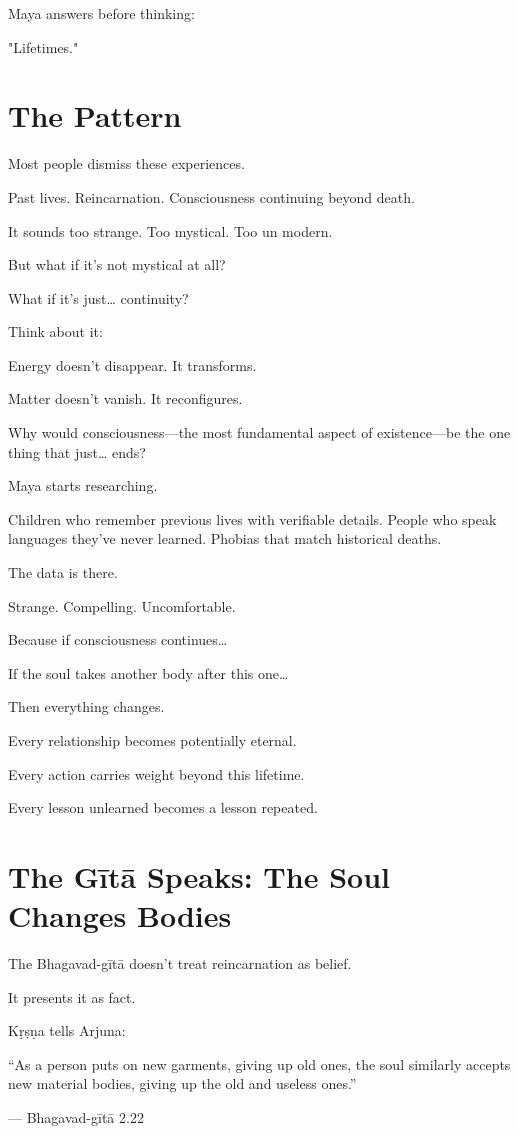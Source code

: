 \documentclass[11pt,twoside]{book}
\begin{document}
Maya answers before thinking:

"Lifetimes."

\section*{The Pattern}

Most people dismiss these experiences.

Past lives. Reincarnation. Consciousness continuing beyond death.

It sounds too strange. Too mystical. Too un modern.

But what if it's not mystical at all?

What if it's just\ldots{} continuity?

Think about it:

Energy doesn't disappear. It transforms.

Matter doesn't vanish. It reconfigures.

Why would consciousness—the most fundamental aspect of existence—be the one thing that just\ldots{} ends?

Maya starts researching.

Children who remember previous lives with verifiable details. People who speak languages they've never learned. Phobias that match historical deaths.

The data is there.

Strange. Compelling. Uncomfortable.

Because if consciousness continues\ldots{}

If the soul takes another body after this one\ldots{}

Then everything changes.

Every relationship becomes potentially eternal.

Every action carries weight beyond this lifetime.

Every lesson unlearned becomes a lesson repeated.

\section*{The Gītā Speaks: The Soul Changes Bodies}

The Bhagavad-gītā doesn't treat reincarnation as belief.

It presents it as fact.

Kṛṣṇa tells Arjuna:

\begin{pullquote}
``As a person puts on new garments, giving up old ones, the soul similarly accepts new material bodies, giving up the old and useless ones.''

--- Bhagavad-gītā 2.22
\end{pullquote}
\end{document}
